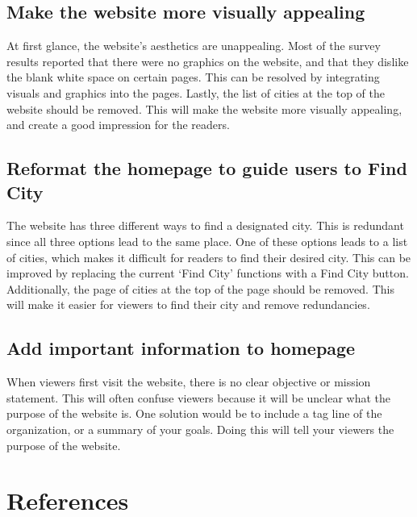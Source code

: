 \documentclass[12pt]{article}
\newcommand\skiplines[1]{\vspace{#1\baselineskip}}
\begin{document}
\subsection*{Make the website more visually appealing}
At first glance, the website’s aesthetics are unappealing. Most of the survey results reported that there were no graphics on the website, and that they dislike the blank white space on certain pages. This can be resolved by integrating visuals and graphics into the pages. Lastly, the list of cities at the top of the website should be removed. This will make the website more visually appealing, and create a good impression for the readers.


\subsection*{Reformat the homepage to guide users to Find City}
The website has three different ways to find a designated city. This is redundant since all three options lead to the same place. One of these options leads to a list of cities, which makes it difficult for readers to find their desired city. This can be improved by replacing the current ‘Find City’ functions with a Find City button. Additionally, the page of cities at the top of the page should be removed. This will make it easier for viewers to find their city and remove redundancies.


\subsection*{Add important information to homepage}
When viewers first visit the website, there is no clear objective or mission statement. This will often confuse viewers because it will be unclear what the purpose of the website is. One solution would be to include a tag line of the organization, or a summary of your goals. Doing this will tell your viewers the purpose of the website. \skiplines{4}



\begin{center}

    

\end{center}


\pagebreak

\section{References}
\end{document}
